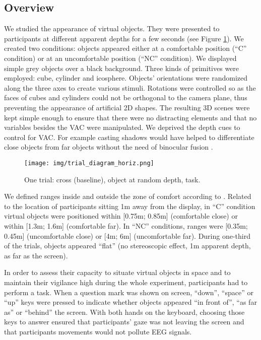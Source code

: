 \documentclass{template/llncs}
\begin{document}
\subsection{Overview}\label{overview}

We studied the appearance of virtual objects. They were presented to participants at different apparent depths for a few seconds (see Figure \ref{fig:trial}). We created two conditions: objects appeared either at a comfortable position (``C'' condition) or at an uncomfortable position (``NC'' condition). We displayed simple grey objects over a black background. Three kinds of primitives were employed: cube, cylinder and icosphere.
Objects' orientations were randomized along the three axes to create various stimuli.
Rotations were controlled so as the faces of cubes and cylinders could not be orthogonal to the camera plane, thus preventing the appearance of artificial 2D shapes. The resulting 3D scenes were kept simple enough to ensure that there were no distracting elements and that no variables besides the VAC were manipulated. We deprived the depth cues to control for VAC. For example casting shadows would have helped to differentiate close objects from far objects without the need of binocular fusion \cite{Mikkola2010}.

\begin{figure}[htbp]
\centering
\texttt{[image: img/trial\_diagram\_horiz.png]}
\caption{One trial: cross (baseline), object at random depth, task.\label{fig:trial}}
\end{figure}

We defined ranges inside and outside the zone of comfort according to \cite{Shibata2011}. Related to the location of participants sitting 1m away from the display, in ``C'' condition virtual objects were positioned within [0.75m; 0.85m] (comfortable close) or within [1.3m; 1.6m] (comfortable far). In ``NC'' conditions, ranges were [0.35m; 0.45m] (uncomfortable close) or [4m; 6m] (uncomfortable far). During one-third of the trials, objects appeared ``flat'' (no stereoscopic effect, 1m apparent depth, as far as the screen).

In order to assess their capacity to situate virtual objects in space and to maintain their vigilance high during the whole experiment, participants had to perform a task. When a question mark was shown on screen, ``down'', ``space'' or ``up'' keys were pressed to indicate whether objects appeared ``in front of'', ``as far as'' or ``behind'' the screen. With both hands on the keyboard, choosing those keys to answer ensured that participants' gaze was not leaving the screen and that participants movements would not pollute EEG signals.
\end{document}
